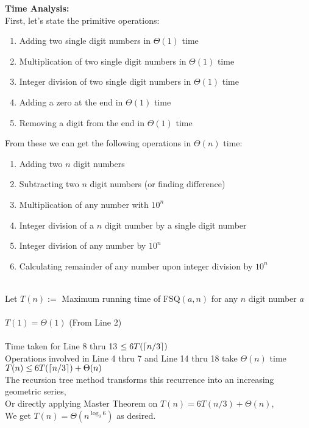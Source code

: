 \documentclass[11pt, fleqn]{article}
\DeclarePairedDelimiter\ceil{\lceil}{\rceil}
\begin{document}
\textbf{Time Analysis:}\\
First, let's state the primitive operations:
\begin{enumerate}[noitemsep]
    \item Adding two single digit numbers in $\Theta(1)$ time
    \item Multiplication of two single digit numbers in $\Theta(1)$ time
    \item Integer division of two single digit numbers in $\Theta(1)$ time
    \item Adding a zero at the end in $\Theta(1)$ time
    \item Removing a digit from the end in $\Theta(1)$ time
\end{enumerate}
From these we can get the following operations in $\Theta(n)$ time:
\begin{enumerate}[noitemsep]
    \item Adding two $n$ digit numbers
    \item Subtracting two $n$ digit numbers (or finding difference)
    \item Multiplication of any number with $10^{n}$
    \item Integer division of a $n$ digit number by a single digit number
    \item Integer division of any number by $10^n$
    \item Calculating remainder of any number upon integer division by $10^n$
\end{enumerate}

~\\
Let $T(n) := $ Maximum running time of FSQ$(a,n)$ for any $n$ digit number $a$ \\~\\
$T(1) = \Theta(1)$ (From Line 2) \\~\\
Time taken for Line 8 thru 13 $\le 6 T(\ceil{n/3})$ \\
Operations involved in Line 4 thru 7 and Line 14 thru 18 take $\Theta(n)$ time \\
$T(n) \le 6 T(\ceil{n/3}) + \Theta(n)$ \\

The recursion tree method transforms this recurrence into an increasing geometric series, \\
Or directly applying Master Theorem on $T(n) = 6 T(n/3) + \Theta(n)$, \\
We get $T(n) = \Theta(n^{\log_3 6})$ as desired.
\end{document}
